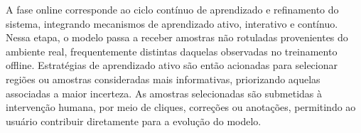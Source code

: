 
A fase online %
corresponde ao ciclo contínuo de aprendizado e refinamento do sistema, integrando mecanismos de aprendizado ativo, interativo e contínuo. Nessa etapa, o modelo passa a receber amostras não rotuladas provenientes do ambiente real, frequentemente distintas daquelas observadas no treinamento offline. Estratégias de aprendizado ativo são então acionadas para selecionar regiões ou amostras consideradas mais informativas, priorizando aquelas associadas a maior incerteza. As amostras selecionadas são submetidas à intervenção humana, por meio de cliques, correções ou anotações, permitindo ao usuário contribuir diretamente para a evolução do modelo.


